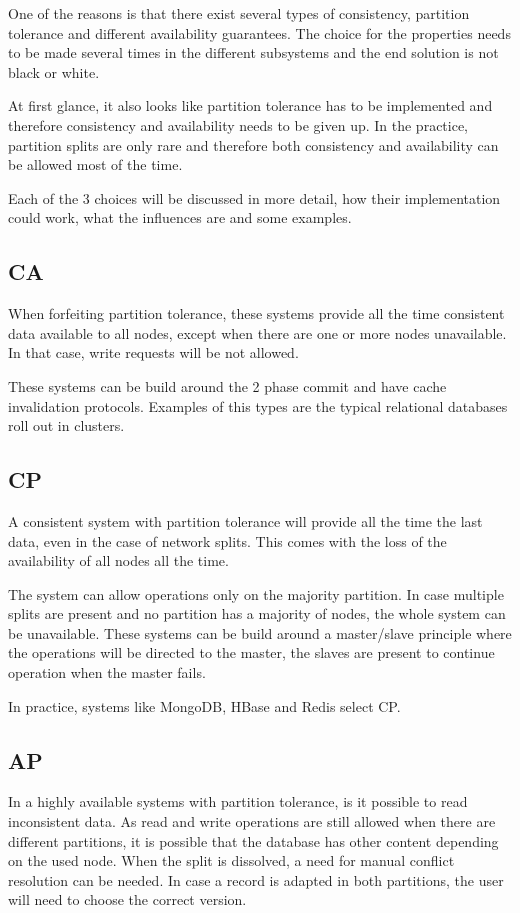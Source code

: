 \documentclass[final,5p,times]{elsarticle}
\begin{document}
One of the reasons is that there exist several types of consistency, partition tolerance and different availability guarantees. The choice for the properties needs to be made several times in the different subsystems and the end solution is not black or white. 

At first glance, it also looks like partition tolerance has to be implemented and therefore consistency and availability needs to be given up. In the practice, partition splits are only rare and therefore both consistency and availability can be allowed most of the time. 

Each of the 3 choices will be discussed in more detail, how their implementation could work, what the influences are and some examples. 

\subsection{CA}
When forfeiting partition tolerance, these systems provide all the time consistent data available to all nodes, except when there are one or more nodes unavailable. In that case, write requests will be not allowed. 

These systems can be build around the 2 phase commit and have cache invalidation protocols. Examples of this types are the typical relational databases roll out in clusters. 

\subsection{CP}
A consistent system with partition tolerance will provide all the time the last data, even in the case of network splits. This comes with the loss of the availability of all nodes all the time. 

The system can allow operations only on the majority partition. In case multiple splits are present and no partition has a majority of nodes, the whole system can be unavailable. These systems can be build around a master/slave principle where the operations will be directed to the master, the slaves are present to continue operation when the master fails.

In practice, systems like MongoDB, HBase and Redis select CP. 

\subsection{AP}
In a highly available systems with partition tolerance, is it possible to read inconsistent data. As read and write operations are still allowed when there are different partitions, it is possible that the database has other content depending on the used node. When the split is dissolved, a need for manual conflict resolution can be needed. In case a record is adapted in both partitions, the user will need to choose the correct version. 
\end{document}
